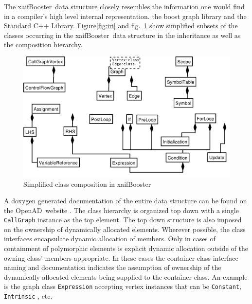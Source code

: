 \documentclass{book}
\newcommand{\OpenAD}{OpenAD}
\newcommand{\xaifBooster}{xaifBooster}
\newcommand{\reffig}[1]{{fig.~\ref{#1}}}
\newcommand{\reffigBS}[1]{{Figure\ref{#1}}}
\begin{document}
The \xaifBooster\ data structure  
closely resembles the information one would find in a 
compiler's high level internal representation. 
the boost graph library \cite{boostWeb}
and the Standard C++ Library\cite{libstdcWeb}.
\reffigBS{fig:iri} and \reffig{fig:irc} show simplified subsets of the classes 
occurring in the \xaifBooster\ data structure in the inheritance 
as well as the composition hierarchy.  
\begin{figure}[htb]
  \centering \includegraphics[width=.45\textwidth]{irComp}
  \caption{Simplified class composition in \xaifBooster} \label{fig:irc}
\end{figure}
A doxygen generated documentation of the entire data structure 
can be found on the \OpenAD\ website \cite{openadWeb}.
The class hierarchy is organized top down with 
a single \lstinline{CallGraph} instance as the top element. 
The top down structure is also imposed on the ownership of dynamically 
allocated elements. 
Wherever possible, the class interfaces encapsulate dynamic 
allocation of members.  
Only in cases of containment of polymorphic elements is explicit dynamic allocation 
outside of the owning class' members appropriate. 
In these cases the container class interface naming and documentation 
indicates the assumption of ownership of 
the dynamically allocated elements being supplied to the container class. 
An example is the graph class \lstinline{Expression} accepting vertex instances that can be 
\lstinline{Constant}, \lstinline{Intrinsic} , etc.
\end{document}
